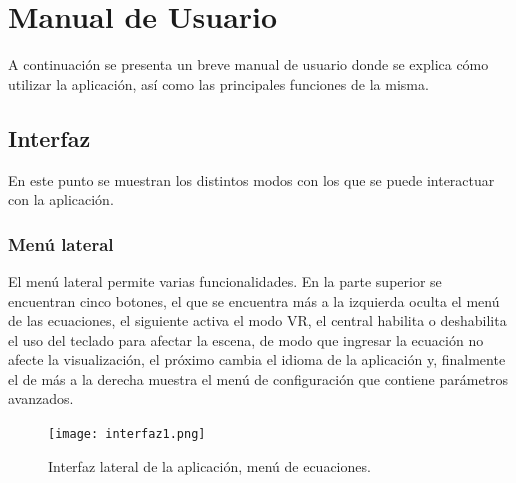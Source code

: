 \documentclass[12pt]{article}
\begin{document}
\section{Manual de Usuario}
A continuación se presenta un breve manual de usuario donde se explica cómo utilizar la aplicación, así como las principales funciones de la misma.
\subsection{Interfaz}
En este punto se muestran los distintos modos con los que se puede interactuar con la aplicación.
\subsubsection{Menú lateral}
El menú lateral permite varias funcionalidades. En la parte superior se encuentran cinco botones, el que se encuentra más a la izquierda oculta el menú de las ecuaciones, el siguiente activa el modo VR, el central habilita o deshabilita el uso del teclado para afectar la escena, de modo que ingresar la ecuación no afecte la visualización, el próximo cambia el idioma de la aplicación y, finalmente el de más a la derecha muestra el menú de configuración que contiene parámetros avanzados.
\begin{figure}
\texttt{[image: interfaz1.png]} 
\caption{Interfaz lateral de la aplicación, menú de ecuaciones.}
\label{menu1}
\end{figure}
\end{document}
